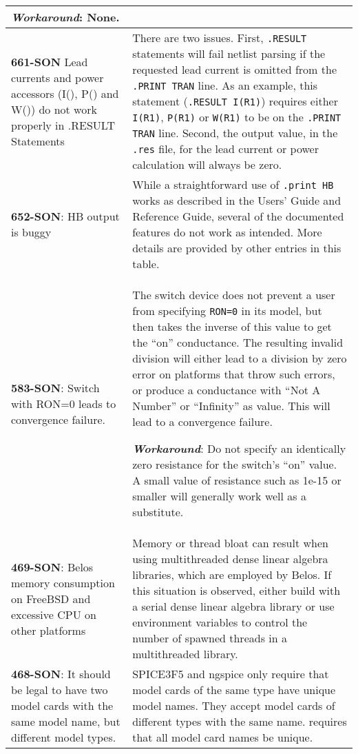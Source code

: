 {\begin{longtable}[h] {>{\raggedright\small}m{2in}|>{\raggedright\let\\\tabularnewline\small}m{3.5in}}
\textbf{\textit{Workaround}}: None. \\ \hline

\textbf{661-SON} Lead currents and power accessors (I(), P() and W()) do
not work properly in .RESULT Statements & There are two issues.
First, \texttt{.RESULT} statements will fail netlist parsing if the
requested lead current is omitted from the \texttt{.PRINT TRAN}
line.  As an example, this statement (\texttt{.RESULT I(R1)}) requires
either \texttt{I(R1)},
\texttt{P(R1)} or \texttt{W(R1)} to be on the \texttt{.PRINT TRAN} line.
Second, the output value, in the \texttt{.res} file, for the lead
current or power calculation will always be zero.
\\ \hline

\textbf{652-SON}: HB output is buggy & While a straightforward use of
\texttt{.print HB} works as described in the \Xyce{} Users' Guide and Reference 
Guide, several of the documented features do not work as intended.  More details
are provided by other entries in this table.
\\ \hline

\textbf{583-SON}: Switch with RON=0 leads to convergence failure. &
The switch device does not prevent a user from
specifying \texttt{RON=0} in its model, but then takes the inverse of
this value to get the ``on'' conductance.  The resulting invalid
division will either lead to a division by zero error on platforms
that throw such errors, or produce a conductance with ``Not A Number''
or ``Infinity'' as value.  This will lead to a convergence failure.

\textbf{\textit{Workaround}}: Do not specify an identically zero resistance
for the switch's ``on'' value.  A small value of resistance such as
1e-15 or smaller will generally work well as a substitute. \\ \hline


\textbf{469-SON}: Belos memory consumption on FreeBSD and excessive CPU on other
platforms & Memory or thread bloat can result when using multithreaded
dense linear algebra libraries, which are employed by Belos.  If this
situation is observed, either build
\Xyce{} with a serial dense linear algebra library or use environment variables
to control the number of spawned threads in a multithreaded library.
\\ \hline


\textbf{468-SON}: It should be legal to have two model cards with the same model
name, but different model types. & SPICE3F5 and ngspice only require
that model cards of the same type have unique model names. They accept
model cards of different types with the same name.  \Xyce{} requires
that all model card names be unique.
\\ \hline



\end{longtable}}
